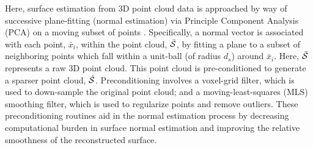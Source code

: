 		Here, surface estimation from 3D point cloud data is approached by way of successive plane-fitting (normal estimation) via Principle Component Analysis (PCA) on a moving subset of points \cite{Pearson1901}. Specifically, a normal vector is associated with each point, $\bar{x}_{i}$, within the point cloud,  $\bar{{\cal S}}$,  by fitting a plane to a subset of neighboring points which fall within a unit-ball (of radius $d_{s}$) around $\bar{x}_{i}$. Here, $\bar{{\cal S}}$ represents a raw 3D point cloud. This point cloud is pre-conditioned to generate a sparser point cloud, $\hat{{\cal S}}$. Preconditioning involves a voxel-grid filter, which is used to down-sample the original point cloud; and a moving-least-squares (MLS) smoothing filter, which is used to regularize points and remove outliers. These preconditioning routines aid in the normal estimation process by decreasing computational burden in surface normal estimation and improving the relative smoothness of the reconstructed surface. 

